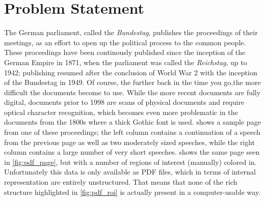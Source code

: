 \section{Problem Statement}
\label{sec:problem}
The German parliament, called the \emph{Bundestag}, publishes the proceedings of
their meetings, as an effort to open up the political process to the common
people. These proceedings have been continously published since the inception of
the German Empire in 1871, when the parliament was called the \emph{Reichstag},
up to 1942; publishing resumed after the conclusion of World War 2 with the
inception of the Bundestag in 1949. Of course, the further back in the time you
go,the more difficult the documents become to use. While the more recent
documents are fully digital, documents prior to 1998 are scans of physical
documents and require optical character recognition, which becomes even more
problematic in the documents from the 1800s where a thick Gothic font is used.
 shows a sample page from one of these proceedings; the
left column contains a continuation of a speech from the previous page as well
as two moderately sized speeches, while the right column contains a large number
of very short speeches.  shows the same page seen in
\cref{fig:pdf_page}, but with a number of regions of interest (manually)
colored in. Unfortunately this data is only available as PDF files, which in
terms of internal representation are entirely unstructured. That means that none
of the rich structure highlighted in \cref{fig:pdf_roi} is actually
present in a computer-usable way.

